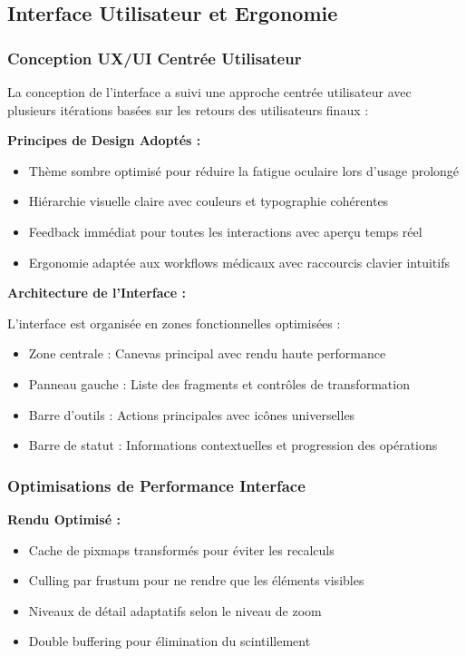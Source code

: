\documentclass[12pt,a4paper]{article}
\begin{document}
\subsection{Interface Utilisateur et Ergonomie}

\subsubsection{Conception UX/UI Centrée Utilisateur}

La conception de l'interface a suivi une approche centrée utilisateur avec plusieurs itérations basées sur les retours des utilisateurs finaux :

\textbf{Principes de Design Adoptés :}
\begin{itemize}
\item Thème sombre optimisé pour réduire la fatigue oculaire lors d'usage prolongé
\item Hiérarchie visuelle claire avec couleurs et typographie cohérentes
\item Feedback immédiat pour toutes les interactions avec aperçu temps réel
\item Ergonomie adaptée aux workflows médicaux avec raccourcis clavier intuitifs
\end{itemize}

\textbf{Architecture de l'Interface :}

L'interface est organisée en zones fonctionnelles optimisées :
\begin{itemize}
\item Zone centrale : Canevas principal avec rendu haute performance
\item Panneau gauche : Liste des fragments et contrôles de transformation
\item Barre d'outils : Actions principales avec icônes universelles
\item Barre de statut : Informations contextuelles et progression des opérations
\end{itemize}

\subsubsection{Optimisations de Performance Interface}

\textbf{Rendu Optimisé :}
\begin{itemize}
\item Cache de pixmaps transformés pour éviter les recalculs
\item Culling par frustum pour ne rendre que les éléments visibles
\item Niveaux de détail adaptatifs selon le niveau de zoom
\item Double buffering pour élimination du scintillement
\end{itemize}
\end{document}
